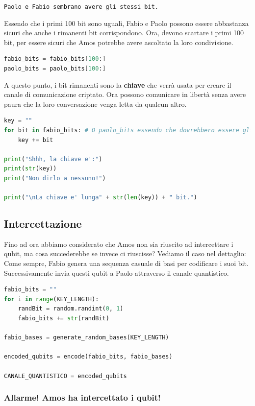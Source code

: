 \documentclass[a4paper]{article}
\begin{document}
\begin{lstlisting}[language=Python]
Paolo e Fabio sembrano avere gli stessi bit.
\end{lstlisting}
Essendo che i primi 100 bit sono uguali, Fabio e Paolo possono essere abbastanza sicuri
che anche i rimanenti bit corrispondono. Ora, devono scartare i primi 100 bit, per essere sicuri che
Amos potrebbe avere ascoltato la loro condivisione.
\begin{lstlisting}[language=Python]
fabio_bits = fabio_bits[100:] 
paolo_bits = paolo_bits[100:] 
\end{lstlisting}
A questo punto, i bit rimanenti sono la \textbf{chiave} che verrà usata per creare
il canale di comunicazione criptato. Ora possono comunicare in libertà senza avere paura che la
loro conversazione venga letta da qualcun altro.
\begin{lstlisting}[language=Python]
key = "" 
for bit in fabio_bits: # O paolo_bits essendo che dovrebbero essere gli stessi.
    key += bit

print("Shhh, la chiave e':")
print(str(key))
print("Non dirlo a nessuno!")

print("\nLa chiave e' lunga" + str(len(key)) + " bit.")
\end{lstlisting}

\subsection{Intercettazione} 

Fino ad ora abbiamo considerato che Amos non sia riuscito ad intercettare i qubit, ma cosa
succederebbe se invece ci riuscisse? Vediamo il caso nel dettaglio:\\
Come sempre, Fabio genera una sequenza casuale di basi per codificare i suoi bit.
Successivamente invia questi qubit a Paolo attraverso il canale quantistico.
\begin{lstlisting}[language=Python]
fabio_bits = ""
for i in range(KEY_LENGTH):
    randBit = random.randint(0, 1) 
    fabio_bits += str(randBit) 
 
fabio_bases = generate_random_bases(KEY_LENGTH)

encoded_qubits = encode(fabio_bits, fabio_bases)

CANALE_QUANTISTICO = encoded_qubits
\end{lstlisting}

\subsubsection{Allarme! Amos ha intercettato i qubit!}
\end{document}
